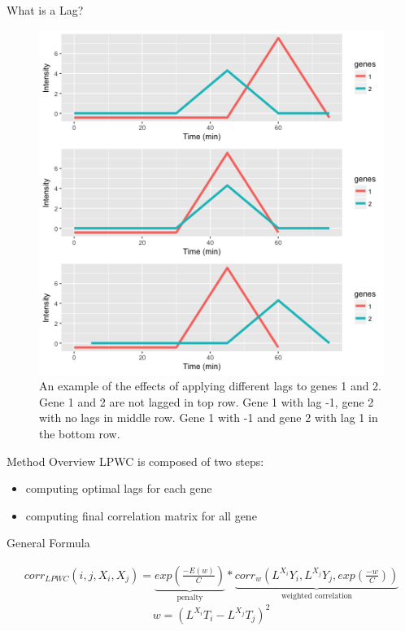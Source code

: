 \documentclass[10pt]{beamer}
\begin{document}
\begin{frame}{What is a Lag?}
\begin{figure}
     \includegraphics[width=0.60\linewidth]{Lags.png}
      \caption{An example of the effects of applying different lags to genes 1 and 2.  Gene 1 and 2 are not lagged in top row. Gene 1 with lag -1, gene 2 with no lags in middle row. Gene 1 with -1 and gene 2 with lag 1 in the bottom row.}
       \label{fig:lags}
    \end{figure}

\end{frame}


\begin{frame}{Method Overview}
LPWC is composed of two steps:
\begin{itemize}
\item computing optimal lags for each gene
\item computing final correlation matrix for all gene
\end{itemize}

General Formula

\begin{multline*}
corr_{LPWC}(i, j, X_i, X_j) = \underbrace{exp(\frac{- E(w)}{C})}_{\text{penalty}}  * 
\underbrace{corr_w(L^{X_i}Y_i, L^{X_j}Y_j, exp(\frac{- w}{C}))}_{\text{weighted correlation}}
\end{multline*}
$$w = (L^{X_i}T_i - L^{X_j}T_j)^2$$
\end{frame}
\end{document}
